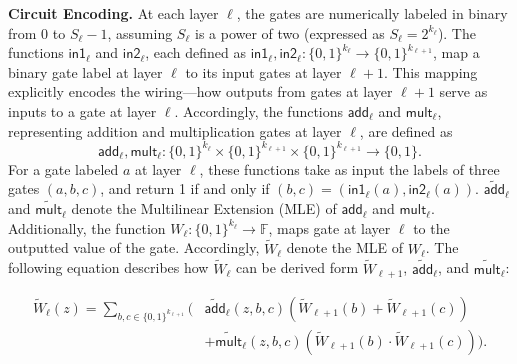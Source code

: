 \noindent\textbf{Circuit Encoding.} At each layer $\ell$, the gates are numerically labeled in binary from $0$ to $S_\ell - 1$, assuming $S_\ell$ is a power of two (expressed as $S_\ell = 2^{k_\ell}$). The functions $\mathsf{in1}_\ell$ and $\mathsf{in2}_\ell$, each defined as $\mathsf{in1}_\ell, \mathsf{in2}_\ell: \{0, 1\}^{k_\ell} \rightarrow \{0, 1\}^{k_{\ell+1}}$, map a binary gate label at layer $\ell$ to its input gates at layer $\ell+1$. This mapping explicitly encodes the wiring—how outputs from gates at layer $\ell+1$ serve as inputs to a gate at layer $\ell$. Accordingly, the functions $\mathsf{add}_\ell$ and $\mathsf{mult}_\ell$, representing addition and multiplication gates at layer $\ell$, are defined as 
\begin{equation*}
	\mathsf{add}_\ell, \mathsf{mult}_\ell: \{0, 1\}^{k_\ell} \times \{0, 1\}^{k_{\ell+1}} \times \{0, 1\}^{k_{\ell+1}} \rightarrow \{0, 1\}.
\end{equation*}
For a gate labeled $a$ at layer $\ell$, these functions take as input the labels of three gates $(a, b, c)$, and return 1 if and only if  $(b, c) = \left(\mathsf{in1}_\ell(a), \mathsf{in2}_\ell(a)\right)$. $\widetilde{\mathsf{add}}_\ell$ and $\widetilde{\mathsf{mult}}_\ell$ denote the Multilinear Extension (MLE) of $\mathsf{add}_\ell$ and $\mathsf{mult}_\ell$. Additionally, the function $W_\ell : \{0, 1\}^{k_\ell} \rightarrow \mathbb{F}$, maps gate at layer $\ell$ to the outputted value of the gate. Accordingly, $\widetilde{W}_\ell$ denote the MLE of $W_\ell$. The following equation describes how $\widetilde{W}_\ell$ can be derived form $\widetilde{W}_{\ell+1}$, $\widetilde{\mathsf{add}}_\ell$, and $\widetilde{\mathsf{mult}}_\ell$:

\begin{align*}
	\widetilde{W}_\ell(z) = \sum_{b,c \in \{0, 1\}^{k_{\ell+1}}} \biggl( & \widetilde{\mathsf{add}}_\ell(z, b, c) \left( \widetilde{W}_{\ell+1}(b) + \widetilde{W}_{\ell+1}(c) \right)  \\ 
	& + \widetilde{\mathsf{mult}}_\ell(z, b, c) \left( \widetilde{W}_{\ell+1}(b) \cdot \widetilde{W}_{\ell+1}(c) \right) \biggr).
\end{align*}

